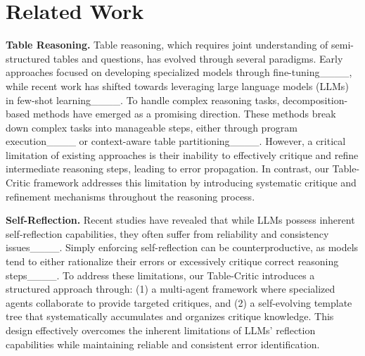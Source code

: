 \section{Related Work}
\textbf{Table Reasoning.}
Table reasoning, which requires joint understanding of semi-structured tables and questions, has evolved through several paradigms. Early approaches focused on developing specialized models through fine-tuning____, while recent work has shifted towards leveraging large language models (LLMs) in few-shot learning____. To handle complex reasoning tasks, decomposition-based methods have emerged as a promising direction. These methods break down complex tasks into manageable steps, either through program execution____ or context-aware table partitioning____. However, a critical limitation of existing approaches is their inability to effectively critique and refine intermediate reasoning steps, leading to error propagation.
In contrast, our Table-Critic framework addresses this limitation by introducing systematic critique and refinement mechanisms throughout the reasoning process.


\textbf{Self-Reflection.}
Recent studies have revealed that while LLMs possess inherent self-reflection capabilities, they often suffer from reliability and consistency issues____. Simply enforcing self-reflection can be counterproductive, as models tend to either rationalize their errors or excessively critique correct reasoning steps____. To address these limitations, our Table-Critic introduces a structured approach through: (1) a multi-agent framework where specialized agents collaborate to provide targeted critiques, and (2) a self-evolving template tree that systematically accumulates and organizes critique knowledge. This design effectively overcomes the inherent limitations of LLMs' reflection capabilities while maintaining reliable and consistent error identification.


